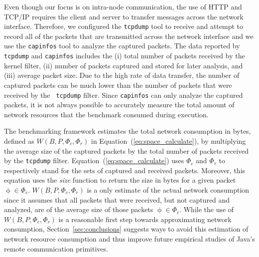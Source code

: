 \documentclass{sig-alternate}
\begin{document}




Even though our focus is on intra-node communication, the use of HTTP
and TCP/IP requires the client and server to transfer messages across
the network interface.  Therefore, we configured the \texttt{tcpdump}
tool to receive and attempt to record all of the packets that are
transmitted across the network interface and we use the {\tt capinfos}
tool to analyze the captured packets.  The data reported by {\tt
  tcpdump} and {\tt capinfos} includes the (i) total number of packets
received by the kernel filter, (ii) number of packets captured and
stored for later analysis, and (iii) average packet size.  Due to the
high rate of data transfer, the number of captured packets can be much
lower than the number of packets that were received by the {\tt
  tcpdump} filter.  Since \texttt{capinfos} can only analyze the
captured packets, it is not always possible to accurately measure the
total amount of network resources that the benchmark consumed during
execution.  

\begin{sloppypar}
The benchmarking framework estimates the total network consumption in
bytes, defined as $W(B,P, \Phi_c, \Phi_r)$ in
Equation~(\ref{eq:space_calculate}), by multiplying the average size
of the captured packets by the total number of packets received by the
{\tt tcpdump} filter.  Equation~(\ref{eq:space_calculate}) uses
$\Phi_c$ and $\Phi_r$ to respectively stand for the sets of captured
and received packets.  Moreover, this equation uses the {\em size}
function to return the size in bytes for a given packet $\upphi \in
\Phi_c$.  $W(B,P, \Phi_c, \Phi_r)$ is a only estimate of the actual
network consumption since it assumes that all packets that were
received, but not captured and analyzed, are of the average size of
those packets $\upphi \in \Phi_c$.  While the use of $W(B,P, \Phi_c,
\Phi_r)$ is a reasonable first step towards approximating network
consumption, Section~\ref{sec:conclusions} suggests ways to avoid
  this estimation of network resource consumption and thus improve
  future empirical studies of Java's remote communication primitives.
\end{sloppypar}
\end{document}
